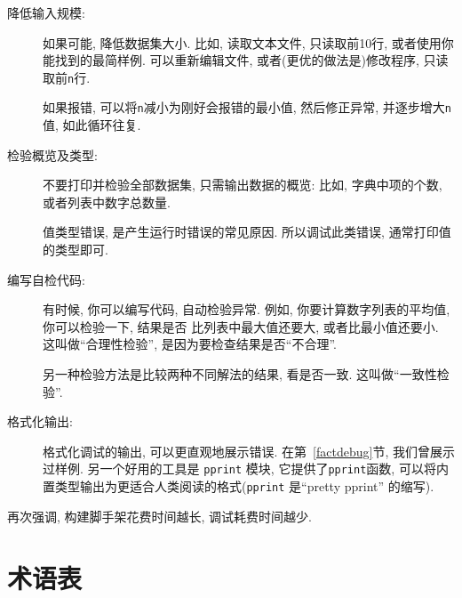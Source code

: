 \documentclass[10pt]{book}
\begin{document}
\begin{description}

\item[降低输入规模:] 如果可能, 降低数据集大小. 比如, 读取文本文件, 
只读取前10行, 或者使用你能找到的最简样例. 
可以重新编辑文件, 或者(更优的做法是)修改程序, 只读取前{\tt n}行. 

如果报错, 可以将{\tt n}减小为刚好会报错的最小值, 
然后修正异常, 并逐步增大{\tt n}值, 如此循环往复. 

\item[检验概览及类型:] 不要打印并检验全部数据集, 只需输出数据的概览:
比如, 字典中项的个数, 或者列表中数字总数量. 

值类型错误, 是产生运行时错误的常见原因. 
所以调试此类错误, 通常打印值的类型即可. 

\item[编写自检代码:]  有时候, 你可以编写代码, 自动检验异常. 
例如, 你要计算数字列表的平均值, 你可以检验一下, 结果是否
比列表中最大值还要大, 或者比最小值还要小. 这叫做``合理性检验'', 
是因为要检查结果是否``不合理''.  

另一种检验方法是比较两种不同解法的结果, 看是否一致. 
这叫做``一致性检验''. 

\item[格式化输出:] 格式化调试的输出, 可以更直观地展示错误. 
在第~\ref{factdebug}节, 我们曾展示过样例. 另一个好用的工具是 {\tt pprint} 模块, 
它提供了{\tt pprint}函数, 可以将内置类型输出为更适合人类阅读的格式({\tt pprint}
是``pretty pprint'' 的缩写).

\end{description}

再次强调, 构建脚手架花费时间越长, 调试耗费时间越少. 


\section{术语表}
\end{document}

